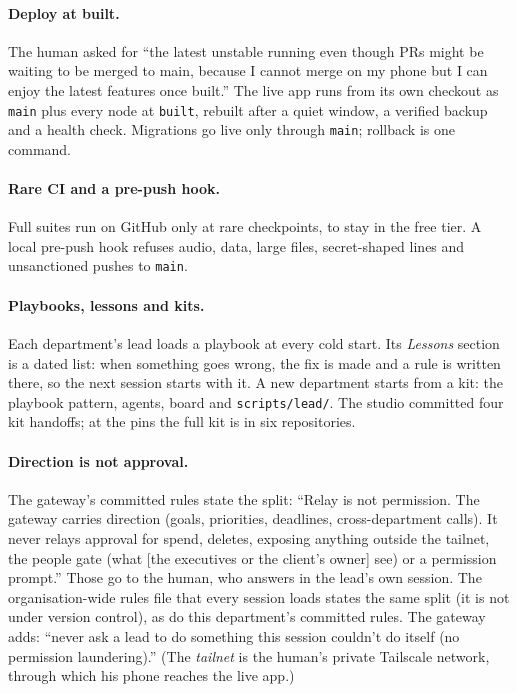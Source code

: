 \documentclass[11pt]{article}
\newcommand{\code}[1]{\texttt{#1}}
\begin{document}
\paragraph{Deploy at built.}
The human asked for ``the latest unstable running even though PRs might be waiting to be %
merged to main, because I cannot merge on my phone but I can enjoy the latest features
once built.'' The live app runs from its own checkout as \code{main} plus every node at
\code{built}, rebuilt after a quiet window, a verified backup and a health check.
Migrations go live only through \code{main}; rollback is one command.

\paragraph{Rare CI and a pre-push hook.}
Full suites run on GitHub only at rare checkpoints, to stay in the free tier. A local
pre-push hook refuses audio, data, large files, secret-shaped lines and unsanctioned
pushes to \code{main}.

\paragraph{Playbooks, lessons and kits.}
Each department's lead loads a playbook at every cold start. Its \emph{Lessons} section
is a dated list: when something goes wrong, the fix is made and a rule is written there,
so the next session starts with it. A new department starts from a kit: the playbook
pattern, agents, board and \code{scripts/lead/}. The studio committed four kit handoffs; %
at the pins the full kit is in six repositories. %

\paragraph{Direction is not approval.}\label{sec:governance}
The gateway's committed rules state the split: ``Relay is not permission. The gateway %
carries direction (goals, priorities, deadlines, cross-department calls). It never relays
approval for spend, deletes, exposing anything outside the tailnet, the people gate (what
[the executives or the client's owner] see) or a permission prompt.'' Those go to the
human, who answers in the lead's own session. The organisation-wide rules file that every %
session loads states the same split (it is not under version control), as do this
department's committed rules. The gateway adds: ``never ask a lead to do something this session couldn't do itself
(no permission laundering).'' (The \emph{tailnet} is the human's private Tailscale
network, through which his phone reaches the live app.)
\end{document}
